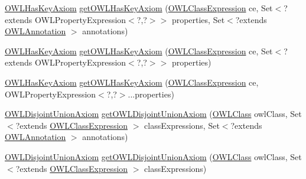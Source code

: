 \begin{DoxyCompactItemize}
\item 
\hyperlink{interfaceorg_1_1semanticweb_1_1owlapi_1_1model_1_1_o_w_l_has_key_axiom}{O\-W\-L\-Has\-Key\-Axiom} \hyperlink{classuk_1_1ac_1_1manchester_1_1cs_1_1owl_1_1owlapi_1_1_o_w_l_data_factory_impl_ae00dc411ed5f8a5fb9d451c11946c937}{get\-O\-W\-L\-Has\-Key\-Axiom} (\hyperlink{interfaceorg_1_1semanticweb_1_1owlapi_1_1model_1_1_o_w_l_class_expression}{O\-W\-L\-Class\-Expression} ce, Set$<$?extends O\-W\-L\-Property\-Expression$<$?,?$>$$>$ properties, Set$<$?extends \hyperlink{interfaceorg_1_1semanticweb_1_1owlapi_1_1model_1_1_o_w_l_annotation}{O\-W\-L\-Annotation} $>$ annotations)
\item 
\hyperlink{interfaceorg_1_1semanticweb_1_1owlapi_1_1model_1_1_o_w_l_has_key_axiom}{O\-W\-L\-Has\-Key\-Axiom} \hyperlink{classuk_1_1ac_1_1manchester_1_1cs_1_1owl_1_1owlapi_1_1_o_w_l_data_factory_impl_ab8f5ae489524cb56e753952c5796a84b}{get\-O\-W\-L\-Has\-Key\-Axiom} (\hyperlink{interfaceorg_1_1semanticweb_1_1owlapi_1_1model_1_1_o_w_l_class_expression}{O\-W\-L\-Class\-Expression} ce, Set$<$?extends O\-W\-L\-Property\-Expression$<$?,?$>$$>$ properties)
\item 
\hyperlink{interfaceorg_1_1semanticweb_1_1owlapi_1_1model_1_1_o_w_l_has_key_axiom}{O\-W\-L\-Has\-Key\-Axiom} \hyperlink{classuk_1_1ac_1_1manchester_1_1cs_1_1owl_1_1owlapi_1_1_o_w_l_data_factory_impl_a131c41c60b5a66a542f86e01c4b43960}{get\-O\-W\-L\-Has\-Key\-Axiom} (\hyperlink{interfaceorg_1_1semanticweb_1_1owlapi_1_1model_1_1_o_w_l_class_expression}{O\-W\-L\-Class\-Expression} ce, O\-W\-L\-Property\-Expression$<$?,?$>$...properties)
\item 
\hyperlink{interfaceorg_1_1semanticweb_1_1owlapi_1_1model_1_1_o_w_l_disjoint_union_axiom}{O\-W\-L\-Disjoint\-Union\-Axiom} \hyperlink{classuk_1_1ac_1_1manchester_1_1cs_1_1owl_1_1owlapi_1_1_o_w_l_data_factory_impl_ab739cdd98c27fa78a6af5c80d8587759}{get\-O\-W\-L\-Disjoint\-Union\-Axiom} (\hyperlink{interfaceorg_1_1semanticweb_1_1owlapi_1_1model_1_1_o_w_l_class}{O\-W\-L\-Class} owl\-Class, Set$<$?extends \hyperlink{interfaceorg_1_1semanticweb_1_1owlapi_1_1model_1_1_o_w_l_class_expression}{O\-W\-L\-Class\-Expression} $>$ class\-Expressions, Set$<$?extends \hyperlink{interfaceorg_1_1semanticweb_1_1owlapi_1_1model_1_1_o_w_l_annotation}{O\-W\-L\-Annotation} $>$ annotations)
\item 
\hyperlink{interfaceorg_1_1semanticweb_1_1owlapi_1_1model_1_1_o_w_l_disjoint_union_axiom}{O\-W\-L\-Disjoint\-Union\-Axiom} \hyperlink{classuk_1_1ac_1_1manchester_1_1cs_1_1owl_1_1owlapi_1_1_o_w_l_data_factory_impl_a8480ae33e8846cd0aaddc71e874d8958}{get\-O\-W\-L\-Disjoint\-Union\-Axiom} (\hyperlink{interfaceorg_1_1semanticweb_1_1owlapi_1_1model_1_1_o_w_l_class}{O\-W\-L\-Class} owl\-Class, Set$<$?extends \hyperlink{interfaceorg_1_1semanticweb_1_1owlapi_1_1model_1_1_o_w_l_class_expression}{O\-W\-L\-Class\-Expression} $>$ class\-Expressions)

\end{DoxyCompactItemize}

